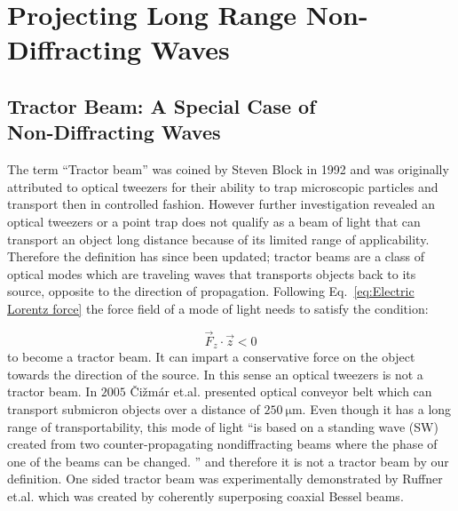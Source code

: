 \chapter{Projecting Long Range Non-Diffracting Waves}
\label{ch:intermediate}

\section{Tractor Beam: A Special Case of  \\ Non-Diffracting Waves}

The term ``Tractor beam'' was coined by Steven Block in 1992 \cite{block1992} and was originally attributed to optical tweezers for their ability to trap microscopic particles and transport then in controlled fashion. However further investigation revealed an optical tweezers or a point trap does not qualify as a beam of light that can transport an object long distance because of its limited range of applicability. Therefore the definition has since been updated; tractor beams are a class of optical modes which are traveling waves that transports objects back to its source, opposite to the direction of propagation. Following Eq.~\eqref{eq:Electric Lorentz force} the force field of a mode of light needs to satisfy the condition:

\begin{equation}
\label{eq:Tractor Fz condition}
\vec{F}_{z}\cdot \vec{z} <0
\end{equation}
to become a tractor beam. It can impart a conservative force on the object towards the direction of the source.  In this sense an optical tweezers is not a tractor beam. In $2005 $ \v Ci\v zm\'ar et.al. \cite{cizmar2005} presented optical conveyor belt which can transport submicron objects over a distance of $\SI{250}{\um}$. Even though it has a long range of transportability, this mode of light ``is based on a standing wave (SW) created from two counter-propagating nondiffracting beams where the phase of one of the beams can be changed. \cite{cizmar2005}'' and therefore it is not a tractor beam by our definition. One sided tractor beam was experimentally demonstrated by Ruffner et.al. \cite{ruffner2012prl} which was created by coherently superposing coaxial Bessel beams.


